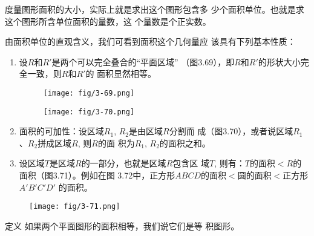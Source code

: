 度量图形面积的大小，实际上就是求出这个图形包含多
少个面积单位。也就是求这个图形所含单位面积的量数，这
个量数是个正实数。

由面积单位的直观含义，我们可看到面积这个几何量应
该具有下列基本性质：
\begin{enumerate}
\item 设$R$和$R'$是两个可以完全叠合的“平面区域”
（图3.69），即$R$和$R'$的形状大小完全一致，则$R$和$R'$的
面积显然相等。
\begin{figure}[htp]
    \centering
\texttt{[image: fig/3-69.png]}
    \caption{}
\end{figure}
\begin{figure}[htp]
    \centering
\texttt{[image: fig/3-70.png]}
    \caption{}
\end{figure}
\item 面积的可加性：设区域$R_1$, $R_2$是由区域$R$分割而
成（图3.70），或者说区域$R_1$、$R_2$拼成区域$R$, 则$R$的面
积为$R_1$, $R_2$的面积之和。
\item 设区域$T$是区域$R$的一部分，也就是区域$R$包含区
域$T$, 则有：$T$的面积$<R$的面积（图3.71）。例如在图
3.72中，正方形$ABCD$的面积$<$圆的面积$<$正方形$A'B'C'D'$
的面积。
\end{enumerate}

\begin{figure}[htp]\centering
    \begin{minipage}[t]{0.48\textwidth}
    \centering
    \texttt{[image: fig/3-71.png]}
    \caption{}
    \end{minipage}
    \begin{minipage}[t]{0.48\textwidth}
    \centering
    \caption{}
    \end{minipage}
    \end{figure}


\begin{blk}{定义}
如果两个平面图形的面积相等，我们说它们是等
积图形。  
\end{blk}

